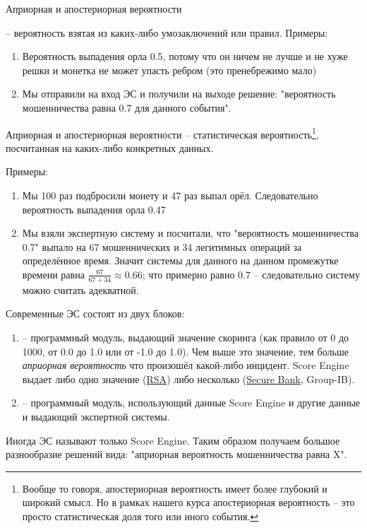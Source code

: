   \begin{frame}{Априорная и апостериорная вероятности}
  
   -- вероятность взятая из каких-либо умозаключений или правил.
  Примеры:
  \begin{enumerate}
  	\item Вероятность выпадения орла 0.5, потому что он ничем не лучше и не хуже решки и монетка не может упасть ребром (это пренебрежимо мало)
  	\item Мы отправили  на вход ЭС и получили на выходе решение: "вероятность мошенничества равна 0.7 для данного события".
  \end{enumerate}
   
  \end{frame}

  \begin{frame}{Априорная и апостериорная вероятности}
  	\small
{} -- статистическая вероятность\footnote{
	Вообще то говоря, апостериорная вероятность имеет более глубокий и широкий смысл.
	Но в рамках нашего курса апостериорная вероятность -- это просто статистическая доля того или иного события.}, посчитанная на каких-либо конкретных данных.

	Примеры: \small
	\begin{enumerate}
		\item Мы 100 раз подбросили монету и 47 раз выпал орёл. Следовательно 
		вероятность выпадения орла 0.47
		\item Мы взяли экспертную систему и посчитали, что  "вероятность мошенничества 0.7"
		выпало на 67 мошеннических и 34 легитимных операций за определённое время. 
		Значит  системы для данного  на данном промежутке времени равна $\frac{67}{67+34} \approx 0.66$; что примерно равно $0.7$ -- следовательно систему можно считать адекватной.
	\end{enumerate}
\end{frame}
  
  \begin{frame}
  Современные ЭС состоят из двух блоков:
  \begin{enumerate}
  	\item {} -- программный модуль, выдающий значение скоринга (как правило от 0 до 1000, от 0.0 до 1.0 или от -1.0 до 1.0). Чем выше это значение, тем больше
  	\textit{априорная вероятность} что произошёл какой-либо инцидент.
  	Score Engine выдает либо одно значение (\href{https://www.rsa.com/en-us/products/fraud-prevention}{RSA}) 
  	либо несколько (\href{https://www.group-ib.ru/secure-bank.html}{Secure Bank}, Group-IB).
  	\item {} -- программный модуль, использующий данные Score Engine и другие данные 
  	и выдающий  экспертной системы.
  \end{enumerate}

  Иногда ЭС называют только Score Engine. Таким образом получаем большое разнообразие решений вида: "априорная вероятность мошенничества равна X".
  \end{frame}
  
